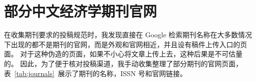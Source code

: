 \section{部分中文经济学期刊官网}
\label{sec:journal-sites}

在收集期刊要求的投稿规范时，我发现直接在 Google 检索期刊名称在大多数情况下出现的都不是期刊的官网，而是外观和官网相近，并且设有稿件上传入口的页面。
对于这种伪造的页面，如果不小心将文章上传上去，这种后果是不可估量的。
因此，为了便于核对投稿渠道，我手动收集整理了部分期刊的官网页面，表~\ref{tab:journals}~展示了期刊的名称，ISSN 号和官网链接。


